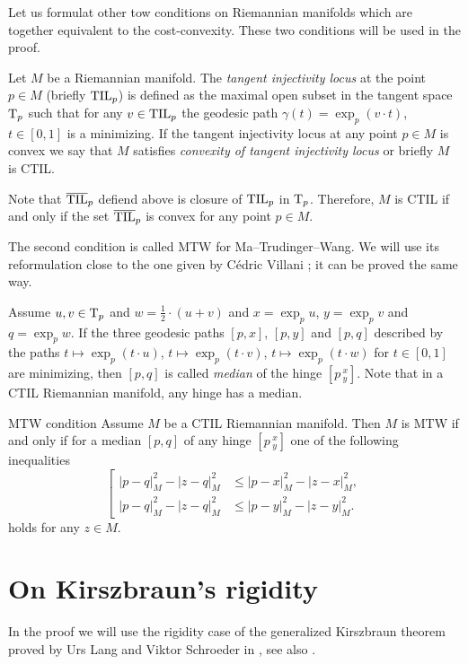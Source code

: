 Let us formulat other tow conditions on Riemannian manifolds which are together equivalent to the cost-convexity.
These two conditions will be used in the proof.

Let $M$ be a Riemannian manifold.
The \emph{tangent injectivity locus} at the point $p\in M$ (briefly $\mathrm{\rm TIL}_p$) is defined as the maximal open subset in the tangent space $\mathrm{T}_p$ such that for any $v\in\mathrm{\rm TIL}_p$ the geodesic path $\gamma(t)=\exp_p(v\cdot t)$, $t\in [0,1]$ is a minimizing.
If the tangent injectivity locus at any point $p\in M$ is convex we say that $M$ satisfies \emph{convexity of  tangent injectivity locus} or briefly $M$ is CTIL.

Note that $\overline{\mathrm{\rm TIL}}_p$ defiend above is closure of $\mathrm{\rm TIL}_p$ in $\mathrm{T}_p$.
Therefore, $M$ is CTIL if and only if the set $\overline{\mathrm{\rm TIL}}_p$ is convex for any point $p\in M$.

The second condition is called MTW for Ma--Trudinger--Wang.
We will use its reformulation close to the one given by Cédric Villani \cite[2.6]{MTW+CTIL}; it can be proved the same way.

Assume $u,v\in \mathrm{T}_p$ and $w=\tfrac12\cdot(u+v)$
and $x=\exp_p u$, $y=\exp_pv$ and $q=\exp_pw$.
If the three geodesic paths $[p,x]$, $[p,y]$ and $[p,q]$ described by the paths 
$t\mapsto\exp_p(t\cdot u)$,  $t\mapsto\exp_p(t\cdot v)$, $t\mapsto\exp_p(t\cdot w)$ for $t\in[0,1]$ are minimizing, then $[p,q]$ is called \emph{median} of the hinge $[p\,^x_y]$.
Note that in a CTIL Riemannian manifold, any hinge has a median.

\begin{thm}{MTW condition}\label{MTW}
Assume $M$ be a CTIL Riemannian manifold. 
Then $M$ is MTW if and only if for a median $[p,q]$ of any hinge $[p\,^x_y]$ one of the following inequalities
\[
\left[
\begin{aligned}
|p-q|^2_M-|z-q|^2_M&\le |p-x|^2_M-|z-x|^2_M,
\\
|p-q|^2_M-|z-q|^2_M&\le |p-y|^2_M-|z-y|^2_M.
\end{aligned}
\right.
\]
holds for any $z\in M$.
\end{thm}

\section{On Kirszbraun's rigidity}
In the proof we will use the rigidity case of the generalized Kirszbraun theorem proved by Urs Lang and Viktor Schroeder in \cite{LS}, see also \cite{AKP}.

